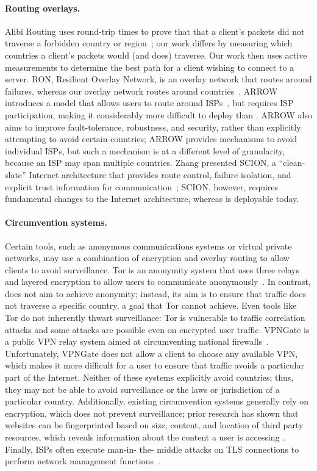 \paragraph{Routing overlays.} Alibi Routing uses round-trip times to prove
that that a client's packets did  not traverse a forbidden country or
region~\cite{levin2015alibi}; our work differs by measuring  which countries a
client's packets would (and does) traverse.  Our work then  uses active
measurements to determine the best path for a client wishing  to connect to a
server.  RON, Resilient Overlay Network, is an overlay network that  routes
around failures, whereas our overlay network routes around
countries~\cite{andersen2001resilient}.  ARROW introduces a model that allows
users to route around ISPs~\cite{peter2015one}, but requires ISP participation,
making it considerably more difficult to deploy
than \system{}. ARROW also aims to improve
fault-tolerance, robustness, and security, rather than explicitly attempting to
avoid certain countries; ARROW provides mechanisms to avoid individual ISPs, but
such a mechanism is at a different level of granularity, because an ISP may span multiple countries.  Zhang
\ea presented SCION, a ``clean-slate'' Internet architecture
that provides route control, failure isolation, and explicit trust information
for communication~\cite{zhang2011scion}; SCION, however, requires fundamental
changes to the Internet architecture, whereas \system{} is deployable today.


\paragraph{Circumvention systems.}  Certain tools, such as anonymous
communications systems or virtual private networks, may use a combination of
encryption and overlay routing to allow clients to avoid surveillance. Tor is
an anonymity system that uses three relays and layered encryption to allow
users to communicate anonymously~\cite{dingledine2004tor}.  In contrast,
\system{} does not aim to achieve anonymity; instead, its aim is to ensure
that traffic does not traverse a specific  country, a goal that Tor cannot
achieve.  Even tools like Tor do not inherently thwart surveillance: Tor is
vulnerable to traffic correlation attacks and some attacks are possible even
on encrypted user traffic. VPNGate is a public VPN relay system aimed at
circumventing national firewalls~\cite{nobori2014vpn}. Unfortunately, VPNGate
does not allow a client to choose any available VPN, which makes it more
difficult for a user to ensure that traffic avoids a particular part of the
Internet.  Neither of these systems explicitly avoid countries; thus, they may
not  be able to avoid surveillance or the laws or jurisdiction of a particular
country. Additionally, existing circumvention systems generally rely on
encryption, which does not prevent surveillance; prior research has shown that
websites can be fingerprinted based on size, content, and location of third
party resources, which  reveals information about the content a user is
accessing \cite{what_isps_can_see}.  Finally, ISPs often execute man-in- the-
middle attacks on TLS connections to perform network management
functions~\cite{mitm_isp}.

